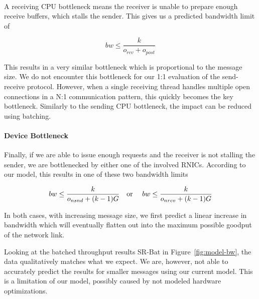 \paragraph{} A receiving CPU bottleneck means the receiver is unable to prepare enough receive buffers, 
which stalls the sender. This gives us a predicted bandwidth limit of

$$
bw \leq \frac{k}{o_{rcv} + o_{post}}
$$

This results in a very similar bottleneck which is proportional to the message size. We do not encounter this bottleneck for
our 1:1 evaluation of the send-receive protocol. However, when a single receiving thread handles multiple open connections 
in a N:1 communication pattern, this quickly becomes the key bottleneck.
Similarly to the sending CPU bottleneck, the impact can be reduced using batching.

\pagebreak
\paragraph{Device Bottleneck} Finally, if we are able to issue enough requests and the receiver is not stalling the sender,
we are bottlenecked by either one of the involved RNICs. According to our model, this results in one of these two
bandwidth limits

$$
bw \leq \frac{k}{o_{nsnd} + (k-1)G} \text{\quad or \quad} bw \leq \frac{k}{o_{nrcv} + (k-1)G}
$$

In both cases, with increasing message size, we first predict a linear increase in bandwidth which will eventually 
flatten out into the maximum possible goodput of the network link.

Looking at the batched throughput results SR-Bat in Figure~\ref{fig:model-bw}, the data qualitatively matches 
what we expect. We are, however, not able to accurately predict the results for smaller messages 
using our current model. This is a limitation of our model,  possibly caused by not modeled hardware optimizations.
